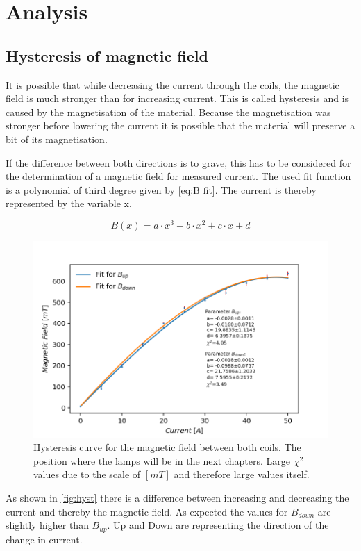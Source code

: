\documentclass[]{article}
\begin{document}
\newpage
\section{Analysis}
\subsection{Hysteresis of magnetic field}
It is possible that while decreasing the current through the coils, the magnetic field is much stronger than for increasing current. This is called hysteresis and is caused by the magnetisation of the material. Because the magnetisation was stronger before lowering the current it is possible that the material will preserve a bit of its magnetisation.

If the difference between both directions is to grave, this has to be considered for the determination of a magnetic field for measured current. The used fit function is a polynomial of third degree given by \autoref{eq:B fit}. The current is thereby represented by the variable x.

\begin{equation}
B(x) = a\cdot x^3 + b\cdot x^2 + c\cdot x + d
\label{eq:B fit}
\end{equation}

\begin{figure}[H]
\centering
\includegraphics[width=.8\textwidth]{Plots/hysteresis.png}
\caption{Hysteresis curve for the magnetic field between both coils. The position where the lamps will be in the next chapters. Large $\chi^2$ values due to the scale of $[mT]$ and therefore large values itself. }
\label{fig:hyst}
\end{figure}

As shown in \autoref{fig:hyst} there is a difference between increasing and decreasing the current and thereby the magnetic field. As expected the values for $B_{down}$ are slightly higher than $B_{up}$. Up and Down are representing the direction of the change in current.
\end{document}
